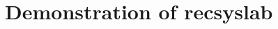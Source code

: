 \documentclass[mathserif,svgnames]{beamer}
\begin{document}
%

\section{Demonstration of recsyslab}
\end{document}
